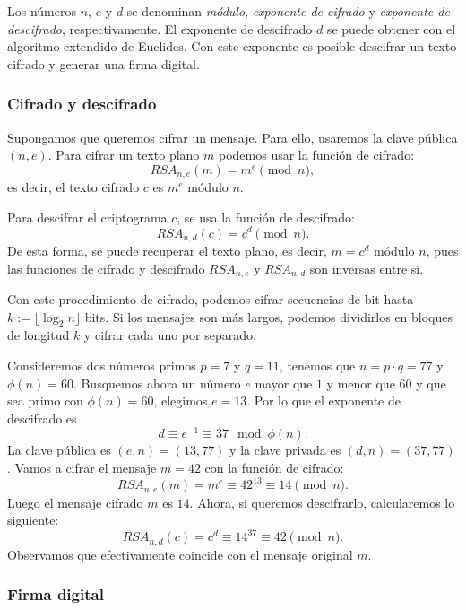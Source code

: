 Los números $n$, $e$ y $d$ se denominan \emph{módulo}, \emph{exponente de cifrado} y \emph{exponente de descifrado}, respectivamente. El exponente de descifrado $d$ se puede obtener con el algoritmo extendido de Euclides. Con este exponente es posible descifrar un texto cifrado y generar una firma digital.

\subsubsection{Cifrado y descifrado}

Supongamos que queremos cifrar un mensaje. Para ello, usaremos la clave pública $(n, e)$. Para cifrar un texto plano $m$ podemos usar la función de cifrado:
\[
    RSA_{n, e}(m) = m^e \pmod{n},
\]
es decir, el texto cifrado $c$ es $m^e$ módulo $n$.

Para descifrar el criptograma $c$, se usa la función de descifrado:
\[
    RSA_{n, d}(c) = c^d \pmod{n}.
\]
De esta forma, se puede recuperar el texto plano, es decir, $m = c^d$ módulo $n$, pues las funciones de cifrado y descifrado $RSA_{n, e}$ y $RSA_{n, d}$ son inversas entre sí.

Con este procedimiento de cifrado, podemos cifrar secuencias de bit hasta $k := \lfloor \log_2{n} \rfloor$ bits. Si los mensajes son más largos, podemos dividirlos en bloques de longitud $k$ y cifrar cada uno por separado.

\begin{exampleth}
    Consideremos dos números primos $p = 7$ y $q = 11$, tenemos que $n = p \cdot q = 77$ y $\phi(n) = 60$. Busquemos ahora un número $e$ mayor que $1$ y menor que $60$ y que sea primo con $\phi(n) = 60$, elegimos $e = 13$. Por lo que el exponente de descifrado es
    \[
        d \equiv e^{-1} \equiv 37 \mod{\phi(n)}.
    \]
    La clave pública es $(e, n) = (13, 77)$ y la clave privada es $(d, n) = (37, 77)$. Vamos a cifrar el mensaje $m = 42$ con la función de cifrado:
    \[
        RSA_{n, e}(m) = m^e \equiv 42^{13} \equiv 14 \pmod{n}.
    \]
    Luego el mensaje cifrado $m$ es $14$. Ahora, si queremos descifrarlo, calcularemos lo siguiente:
    \[
        RSA_{n, d}(c) = c^d \equiv 14^{37} \equiv 42 \pmod{n}.
    \]
    Observamos que efectivamente coincide con el mensaje original $m$.
\end{exampleth}

\subsubsection{Firma digital}

